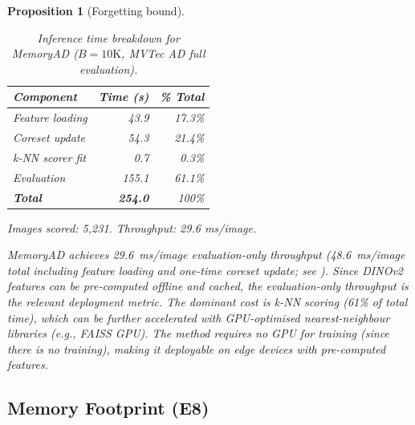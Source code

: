 \documentclass[conference]{IEEEtran}
\newcommand{\method}{MemoryAD}
\newcommand{\eg}{\textit{e.g.}}
\newtheorem{proposition}{Proposition}
\begin{document}
\begin{proposition}[Forgetting bound]
\begin{table}[htbp]
\centering
\caption{Inference time breakdown for MemoryAD ($B=10\text{K}$, MVTec AD full evaluation).}
\label{tab:inference_speed}
\begin{threeparttable}
\begin{tabular}{lrr}
\toprule
Component & Time (s) & \% Total \\
\midrule
Feature loading & 43.9 & 17.3\% \\
Coreset update & 54.3 & 21.4\% \\
k-NN scorer fit & 0.7 & 0.3\% \\
Evaluation & 155.1 & 61.1\% \\
\midrule
\textbf{Total} & \textbf{254.0} & 100\% \\
\bottomrule
\end{tabular}
\begin{tablenotes}
\item Images scored: 5,231. Throughput: 29.6 ms/image.
\end{tablenotes}
\end{threeparttable}
\end{table}

\method{} achieves 29.6~ms/image evaluation-only throughput (48.6~ms/image total including feature loading and one-time coreset update; see ). Since DINOv2 features can be pre-computed offline and cached, the evaluation-only throughput is the relevant deployment metric. The dominant cost is k-NN scoring (61\% of total time), which can be further accelerated with GPU-optimised nearest-neighbour libraries (\eg, FAISS GPU). The method requires no GPU for training (since there is no training), making it deployable on edge devices with pre-computed features.

\subsection{Memory Footprint (E8)}


\end{proposition}
\end{document}

